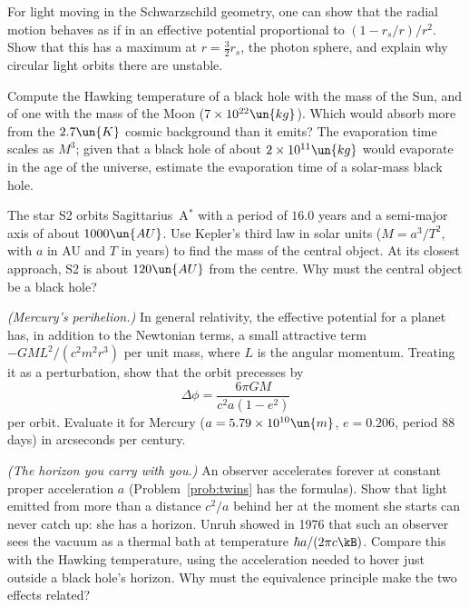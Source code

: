 \begin{problems}
 For light moving in the Schwarzschild geometry, one can show that the radial motion behaves as if in an effective potential proportional to $(1 - r_s/r)/r^2$. Show that this has a maximum at $r = \tfrac32r_s$, the photon sphere, and explain why circular light orbits there are unstable.

 Compute the Hawking temperature of a black hole with the mass of the Sun, and of one with the mass of the Moon ($7\times10^{22}\un{kg}$). Which would absorb more from the $2.7\un{K}$ cosmic background than it emits? The evaporation time scales as $M^3$; given that a black hole of about $2\times10^{11}\un{kg}$ would evaporate in the age of the universe, estimate the evaporation time of a solar-mass black hole.

\core \label{prob:sgra} The star S2 orbits Sagittarius~A$^*$ with a period of $16.0$ years and a semi-major axis of about $1000\un{AU}$. Use Kepler's third law in solar units ($M = a^3/T^2$, with $a$ in AU and $T$ in years) to find the mass of the central object. At its closest approach, S2 is about $120\un{AU}$ from the centre. Why must the central object be a black hole?

\core \label{prob:perihelion} \emph{(Mercury's perihelion.)} In general relativity, the effective potential for a planet has, in addition to the Newtonian terms, a small attractive term $-GML^2/(c^2m^2r^3)$ per unit mass, where $L$ is the angular momentum. Treating it as a perturbation, show that the orbit precesses by
\[
  \Delta\phi = \frac{6\pi GM}{c^2a(1-e^2)}
\]
per orbit. Evaluate it for Mercury ($a = 5.79\times10^{10}\un{m}$, $e = 0.206$, period $88$ days) in arcseconds per century.

 \emph{(The horizon you carry with you.)} An observer accelerates forever at constant proper acceleration $a$ (Problem~\ref{prob:twins} has the formulas). Show that light emitted from more than a distance $c^2/a$ behind her at the moment she starts can never catch up: she has a horizon. Unruh showed in 1976 that such an observer sees the vacuum as a thermal bath at temperature $\hbar a/(2\pi c\kB)$. Compare this with the Hawking temperature, using the acceleration needed to hover just outside a black hole's horizon. Why must the equivalence principle make the two effects related?
\end{problems}

\begin{reading}
\end{reading}
